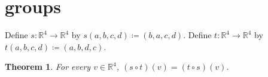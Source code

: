 \documentclass{article}
\newtheorem{theorem}{Theorem}
\begin{document}
\section{groups}
Define $s:\mathbb{R}^4\to\mathbb{R}^4$ by $s(a,b,c,d)\coloneqq(b,a,c,d)$.
Define $t:\mathbb{R}^4\to\mathbb{R}^4$ by $t(a,b,c,d)\coloneqq(a,b,d,c)$.
\begin{theorem}\label{thm:RG04}
For every $v\in\mathbb{R}^4$, $(s\circ t)(v)=(t\circ s)(v)$.
\end{theorem}
\end{document}
